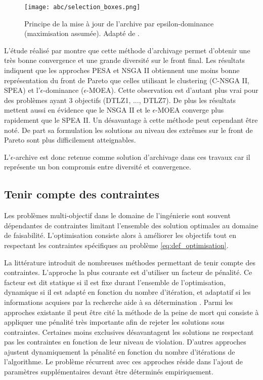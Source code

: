 \begin{figure}
    \begin{center}
        \texttt{[image: abc/selection\_boxes.png]}
    \end{center}
    \caption{Principe de la mise à jour de l’archive par epsilon-dominance (maximisation assumée).
             Adapté de \cite{Deb2005501}.
             \label{fig:epsilon_dominance}}
\end{figure}

L’étude réalisé par \cite{Deb2005501} montre que cette méthode d’archivage permet
d’obtenir une très bonne convergence et une grande diversité sur le front final. Les résultats
indiquent que les approches PESA et NSGA II obtiennent une moins bonne représentation
du front de Pareto que celles utilisant le clustering (C-NSGA II, SPEA) et l’$\epsilon$-dominance ($\epsilon$-MOEA).
Cette observation est d’autant plus vrai pour des problèmes ayant 3 objectifs (DTLZ1, ..., DTLZ7).
De plus les résultats mettent aussi en évidence que le NSGA II et le $\epsilon$-MOEA
converge plus rapidement que le SPEA II.
Un désavantage à cette méthode peut cependant être noté. De part sa formulation
les solutions au niveau des extrêmes sur le front de Pareto sont plus difficilement
atteignables.

L’$\epsilon$-archive est donc retenue comme solution d’archivage dans ces travaux
car il représente un bon compromis entre diversité et convergence.


\subsection{Tenir compte des contraintes} %
\label{sub:tenir_compte_des_contraintes}
Les problèmes multi-objectif dans le domaine de l’ingénierie sont souvent
dépendantes de contraintes limitant l’ensemble des solution optimales au domaine
de faisabilité. L’optimisation consiste alors à améliorer les objectifs tout en
respectant les contraintes spécifiques au problème \eqref{eq:def_optimisation}.

La littérature introduit de nombreuses méthodes permettant de tenir compte des
contraintes. L’approche la plus courante est d’utiliser un facteur de pénalité.
Ce facteur est dit statique si il est fixe durant l’ensemble de l’optimisation, dynamique
si il est adapté en fonction du nombre d’itération, et adaptatif si les informations
acquises par la recherche aide à sa détermination \parencite{Coello2002}.
Parmi les approches existante il peut être cité la méthode de la peine de mort
qui consiste à appliquer une pénalité très importante afin de rejeter les solutions
sous contraintes. Certaines moins exclusives désavantagent les solutions ne respectant
pas les contraintes en fonction de leur niveau de violation. D’autres approches
ajustent dynamiquement la pénalité en fonction du nombre d’itérations de l’algorithme. Le
problème récurrent avec ces approches réside dans l’ajout de paramètres supplémentaires
devant être déterminés empiriquement.

